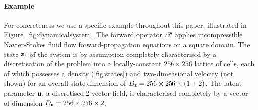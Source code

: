 \paragraph{Example} For concreteness we use a specific example throughout this paper, illustrated in  Figure~\ref{fig:dynamicalsystem}.
The forward operator $\mathscr{P}$ applies incompressible Navier-Stokes fluid flow forward-propagation equations on a square domain.
The state $\boldsymbol{\mathsf{z}}_t$ of the system is by assumption completely characterised by a discretisation of the problem into a locally-constant \(256\times 256\) lattice of cells, each of which possesses a density (\ref{fig:states}) and two-dimensional velocity (not shown) for an overall state dimension of \(D_{\boldsymbol{\mathsf{z}}}=256\times 256 \times (1+2)\).
The latent parameter $\boldsymbol{\mathsf{u}}$, a discretised 2-vector field, is characterised completely by a vector of dimension \(D_{\boldsymbol{\mathsf{u}}}=256\times 256 \times 2\).

